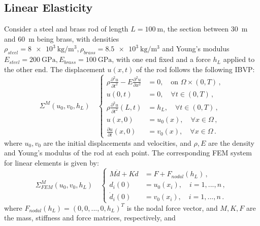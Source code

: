 \documentclass[letterpaper, 10 pt, conference]{ieeeconf/ieeeconf}
\begin{document}
\subsection{Linear Elasticity}
\label{sub:linear_elasticity}

Consider a steel and brass rod of length $L = \SI{100}{\m}$, the section between 
\SI{30}{\m} and \SI{60}{\m} being brass, with densities $\rho_{steel} =
\SI{8e3}{\kg\per\m^3}, \rho_{brass} = \SI{8.5e3}{\kg\per\m^3}$ and Young's
modulus $E_{steel} = \SI{200}{\giga\pascal}, E_{brass} =
\SI{100}{\giga\pascal}$,
with one end fixed and a force $h_L$ applied to the
other end. The displacement $u(x, t)$ of the rod follows the following IBVP:
%
\begin{equation}\label{eq:pde_mech}
    \Sigma^{M}(u_0, v_0, h_L) \quad \left \{
    \begin{aligned}
        \rho \frac{\partial^2 u}{\partial t^2} - E \frac{\partial^2
        u}{\partial x^2} &= 0, \quad \text{on } \Omega \times (0, T) \,, \\
        u(0, t) &= 0, \quad \forall t \in (0, T) \,, \\
        \rho \frac{\partial^2 u}{\partial t^2}(L, t) &= h_L, \quad 
        \forall t \in (0, T) \,, \\
        u(x, 0) &= u_0(x), \quad \forall x \in \Omega \,, \\
        \frac{\partial u}{\partial t}(x, 0) &= v_0(x), \quad \forall x \in \Omega \,.
    \end{aligned}
    \right.
\end{equation}
%
where $u_0, v_0$ are the initial displacements and velocities, and $\rho, E$ are
the density and Young's modulus of the rod at each point.
The corresponding FEM system for linear elements is given by:
%
\begin{equation}\label{eq:fem_mech}
    \Sigma^M_{FEM}(u_0, v_0, h_L) \quad \left \{
    \begin{aligned}
        M\ddot{d} + K d &= F + F_{nodal}(h_L) \,, \\
        d_i(0) &= u_0(x_i), \quad i = 1,...,n \,, \\
        \dot{d}_i(0) &= v_0(x_i), \quad i = 1,...,n \,.
    \end{aligned}
    \right.
\end{equation}
%
where $F_{nodal}(h_L) = (0, 0, ..., 0, h_L)^T$ is the nodal force vector, and $M, K, F$ 
are the mass, stiffness and force matrices, respectively, and
\end{document}
